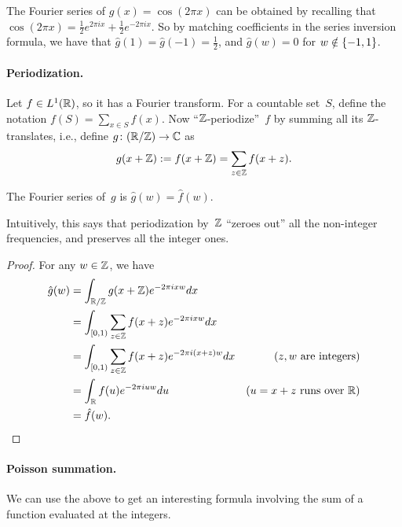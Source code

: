 \documentclass[11pt]{article}
\begin{document}
\begin{example}
  The Fourier series of $g(x) = \cos(2\pi x)$ can be obtained by
  recalling that
  $\cos(2 \pi x) = \tfrac12 e^{2\pi i x} + \tfrac12 e^{-2\pi i x}$. So
  by matching coefficients in the series inversion formula, we have
  that $\hat{g}(1) = \hat{g}(-1) = \tfrac12$, and $\hat{g}(w)=0$ for
  $w \notin \{-1,1\}$.
\end{example}

\paragraph{Periodization.}

Let $f \in L^{1}(\mathbb{R})$, so it has a Fourier transform. For a countable
set~$S$, define the notation $f(S) = \sum_{x \in S} f(x)$. Now
``$\mathbb{Z}$-periodize''~$f$ by summing all its $\mathbb{Z}$-translates, i.e.,
define $g \colon (\mathbb{R}/\mathbb{Z}) \to \mathbb{C}$ as
\begin{equation}
  \label{eq:periodize}
  g(x + \mathbb{Z}) := f(x + \mathbb{Z}) = \sum_{z \in \mathbb{Z}} f(x+z) .
\end{equation}

\begin{lemma}
  \label{lem:periodize}
  The Fourier series of~$g$ is $\hat{g}(w) = \hat{f}(w)$.
\end{lemma}

Intuitively, this says that periodization by~$\mathbb{Z}$ ``zeroes out'' all
the non-integer frequencies, and preserves all the integer ones.

\begin{proof}
  For any $w \in \mathbb{Z}$, we have
  \begin{align*}
    \hat{g}(w)
    &= \int_{\mathbb{R}/\mathbb{Z}} g(x+\mathbb{Z}) e^{-2\pi i x w} dx \\
    &= \int_{[0,1)} \sum_{z \in \mathbb{Z}} f(x+z) e^{-2\pi i x w} dx \\
    &= \int_{[0,1)} \sum_{z \in \mathbb{Z}} f(x+z) e^{-2\pi i (x+z) w} dx
    & \text{($z,w$ are integers)} \\
    &= \int_{\mathbb{R}} f(u) e^{-2\pi i u w} du
    & \text{($u=x+z$ runs over~$\mathbb{R}$)} \\
    &= \hat{f}(w) .
  \end{align*}
\end{proof}

\paragraph{Poisson summation.}

We can use the above to get an interesting formula involving the sum
of a function evaluated at the integers.
\end{document}
